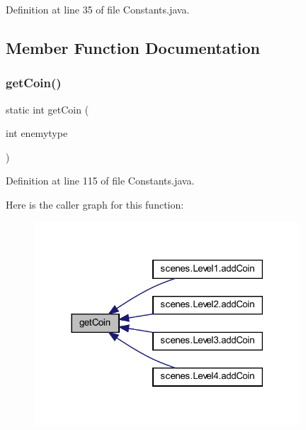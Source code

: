 Definition at line 35 of file Constants.\+java.



\subsection{Member Function Documentation}
\mbox{\label{classhelpz_1_1_constants_1_1_enemy_ad9bfb7d57265918ecda5f2892ff8b015}} 
\subsubsection{\texorpdfstring{get\+Coin()}{getCoin()}}
{\footnotesize\ttfamily static int get\+Coin (\begin{DoxyParamCaption}\item[{int}]{enemytype }\end{DoxyParamCaption})\hspace{0.3cm}{\ttfamily [static]}}



Definition at line 115 of file Constants.\+java.

Here is the caller graph for this function\+:\nopagebreak
\begin{figure}[H]
\begin{center}
\leavevmode
\includegraphics[width=282pt]{classhelpz_1_1_constants_1_1_enemy_ad9bfb7d57265918ecda5f2892ff8b015_icgraph}
\end{center}
\end{figure}
\mbox{\label{classhelpz_1_1_constants_1_1_enemy_ae580ad256190536e1616820765f54da5}} 
